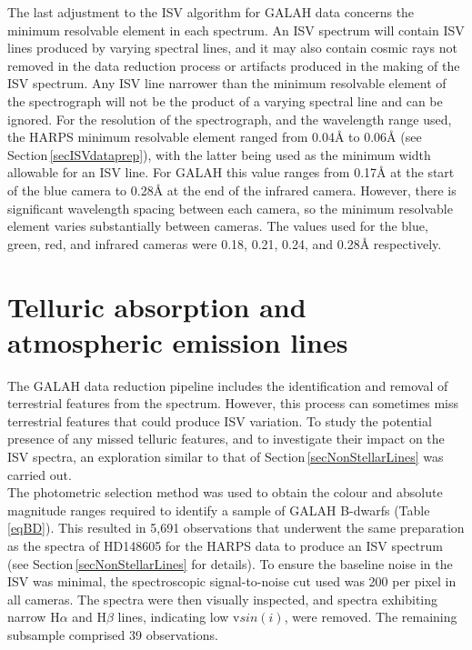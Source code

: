 The last adjustment to the ISV algorithm for GALAH data concerns the minimum resolvable element in each spectrum. An ISV spectrum will contain ISV lines produced by varying spectral lines, and it may also contain cosmic rays not removed in the data reduction process or artifacts produced in the making of the ISV spectrum. Any ISV line narrower than the minimum resolvable element of the spectrograph will not be the product of a varying spectral line and can be ignored. For the resolution of the spectrograph, and the wavelength range used, the HARPS minimum resolvable element ranged from 0.04\hbox{\AA} to 0.06\hbox{\AA} (see Section\,\ref{secISVdataprep}), with the latter being used as the minimum width allowable for an ISV line. For GALAH this value ranges from 0.17\hbox{\AA} at the start of the blue camera to 0.28\hbox{\AA} at the end of the infrared camera. However, there is significant wavelength spacing between each camera, so the minimum resolvable element varies substantially between cameras. The values used for the blue, green, red, and infrared cameras were 0.18, 0.21, 0.24, and 0.28\hbox{\AA} respectively.

\section{Telluric absorption and atmospheric emission lines}
\label{secGALAHnonstellar}
The GALAH data reduction pipeline includes the identification and removal of terrestrial features from the spectrum. However, this process can sometimes miss terrestrial features that could produce ISV variation. To study the potential presence of any missed telluric features, and to investigate their impact on the ISV spectra, an exploration similar to that of Section\,\ref{secNonStellarLines} was carried out.\\  

The photometric selection method was used to obtain the colour and absolute magnitude ranges required to identify a sample of GALAH B-dwarfs (Table\,\ref{eqBD}). This resulted in 5,691 observations that underwent the same preparation as the spectra of HD148605 for the HARPS data to produce an ISV spectrum (see Section\,\ref{secNonStellarLines} for details). To ensure the baseline noise in the ISV was minimal, the spectroscopic signal-to-noise cut used was 200 per pixel in all cameras. The spectra were then visually inspected, and spectra exhibiting narrow H$\alpha$ and H$\beta$ lines, indicating low v$sin(i)$, were removed. The remaining subsample comprised 39 observations.\\

